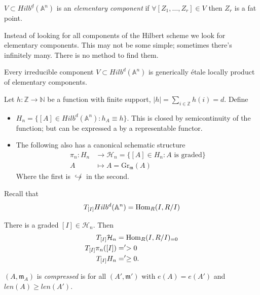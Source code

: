 \begin{definition}
\label{definition-elementary-componenet}
$V \subset
Hilb^{\underline{d}}(\mathbb{A}^n)$ is
an {\it elementary component} if
$\forall [Z_1,\ldots,Z_r] \in V$
then $Z_r$ is a fat point.
\end{definition}

Instead of looking for all components of the
Hilbert scheme
we look for elementary components. This may
not be some simple;
sometimes there's infinitely many. There
is no method to find them.

\begin{theorem}[Irrabaro]
\label{theorem-i}
Every irreducible component $V \subset
Hilb^d(\mathbb{A}^n)$
is generically étale locally product of
elementary components.
\end{theorem}

\begin{definition}
\label{definition-}
Let $h:\mathbb{Z} \to \mathbb{N}$ be a
function
with finite support, $|h|=\sum_{ i \in
\mathbb{Z}}h(i)=d$. Define
\begin{itemize}
\item $H_n=\{[A] \in Hilb^d(\mathbb{A}^n):
h_A \equiv h\}$.
This is closed by semicontinuity of the
function; but can be expressed
a by a representable functor.
\item The following also has a canonical
schematic structure
$$
\begin{aligned}
\pi_n:H_n  &\longrightarrow
\mathcal{H}_n=\{[A] \in H_n: A\text{ is
graded}\} \\
A &\longmapsto A=\text{Gr}_{\mathfrak{m}}(A)
\end{aligned}
$$
Where the first is $\not\hookrightarrow $ in
the second.
\end{itemize}
\end{definition}

Recall that
$$
T_{[I]}Hilb^d(\mathbb{A}^n)=\mathop{\mathrm{Hom}}\nolimits_R(I,R/I)
$$
\begin{theorem}[B-B,J,G G G L]
\label{theorem-b-b-j-g-g-g-l}
There is a graded $[I] \in \mathcal{H}_n$.
Then
$$
\begin{aligned}
T_{[I]}\mathcal{H}_n&=\mathop{\mathrm{Hom}}\nolimits_R(I,R/I)_{=0}\\
T_{[I]}\pi_n([I])&='>0\\
T_{[I]}H_n&=' \geq 0.
\end{aligned}
$$
\end{theorem}

\begin{definition}
\label{definition-compressed}
$(A,\mathfrak{m}_A)$ is {\it compressed} is
for all  $(A',\mathfrak{m}')$
with $e(A)=e(A')$ and $len(A) \geq  len(A')
$.
\end{definition}

